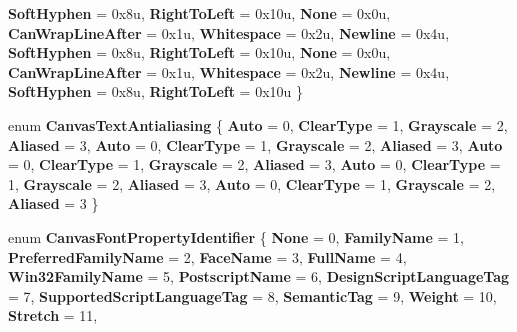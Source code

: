 \begin{DoxyCompactItemize}
{\bfseries Soft\+Hyphen} = 0x8u, 
{\bfseries Right\+To\+Left} = 0x10u, 
{\bfseries None} = 0x0u, 
{\bfseries Can\+Wrap\+Line\+After} = 0x1u, 
\newline
{\bfseries Whitespace} = 0x2u, 
{\bfseries Newline} = 0x4u, 
{\bfseries Soft\+Hyphen} = 0x8u, 
{\bfseries Right\+To\+Left} = 0x10u, 
\newline
{\bfseries None} = 0x0u, 
{\bfseries Can\+Wrap\+Line\+After} = 0x1u, 
{\bfseries Whitespace} = 0x2u, 
{\bfseries Newline} = 0x4u, 
\newline
{\bfseries Soft\+Hyphen} = 0x8u, 
{\bfseries Right\+To\+Left} = 0x10u
 \}
\item 
\mbox{\label{namespace_microsoft_1_1_graphics_1_1_canvas_1_1_text_ac5d7a4bab634cb1b3f6a231971b80974}} 
enum {\bfseries Canvas\+Text\+Antialiasing} \{ \newline
{\bfseries Auto} = 0, 
{\bfseries Clear\+Type} = 1, 
{\bfseries Grayscale} = 2, 
{\bfseries Aliased} = 3, 
\newline
{\bfseries Auto} = 0, 
{\bfseries Clear\+Type} = 1, 
{\bfseries Grayscale} = 2, 
{\bfseries Aliased} = 3, 
\newline
{\bfseries Auto} = 0, 
{\bfseries Clear\+Type} = 1, 
{\bfseries Grayscale} = 2, 
{\bfseries Aliased} = 3, 
\newline
{\bfseries Auto} = 0, 
{\bfseries Clear\+Type} = 1, 
{\bfseries Grayscale} = 2, 
{\bfseries Aliased} = 3, 
\newline
{\bfseries Auto} = 0, 
{\bfseries Clear\+Type} = 1, 
{\bfseries Grayscale} = 2, 
{\bfseries Aliased} = 3
 \}
\item 
\mbox{\label{namespace_microsoft_1_1_graphics_1_1_canvas_1_1_text_a79bca70c038ce3691b2e0c4ded541979}} 
enum {\bfseries Canvas\+Font\+Property\+Identifier} \{ \newline
{\bfseries None} = 0, 
{\bfseries Family\+Name} = 1, 
{\bfseries Preferred\+Family\+Name} = 2, 
{\bfseries Face\+Name} = 3, 
\newline
{\bfseries Full\+Name} = 4, 
{\bfseries Win32\+Family\+Name} = 5, 
{\bfseries Postscript\+Name} = 6, 
{\bfseries Design\+Script\+Language\+Tag} = 7, 
\newline
{\bfseries Supported\+Script\+Language\+Tag} = 8, 
{\bfseries Semantic\+Tag} = 9, 
{\bfseries Weight} = 10, 
{\bfseries Stretch} = 11, 
\newline

\end{DoxyCompactItemize}
